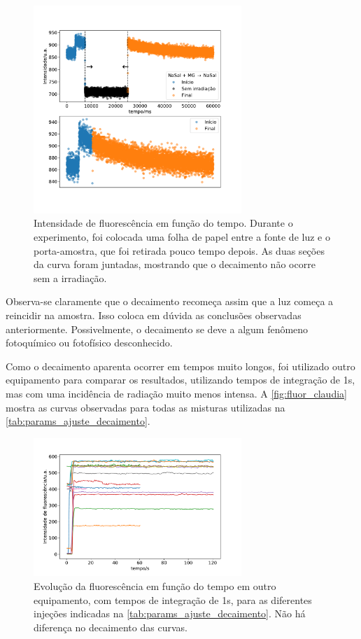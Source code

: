 	\begin{figure}[h]
		\centering
		\includegraphics[width=0.7\textwidth]{imagens/fluor/buraco}
		\caption{Intensidade de fluorescência em função do tempo. Durante o experimento, foi colocada uma folha de papel entre a fonte de luz e o porta-amostra, que foi retirada pouco tempo depois. As duas seções da curva foram juntadas, mostrando que o decaimento não ocorre sem a irradiação.}
		\label{fig:fluorescencia_buraco}
	\end{figure}
	
	Observa-se claramente que o decaimento recomeça assim que a luz começa a reincidir na amostra. Isso coloca em dúvida as conclusões observadas anteriormente. Possivelmente, o decaimento se deve a algum fenômeno fotoquímico ou fotofísico desconhecido.
	
	Como o decaimento aparenta ocorrer em tempos muito longos, foi utilizado outro equipamento para comparar os resultados, utilizando tempos de integração de 1s, mas com uma incidência de radiação muito menos intensa. A \autoref{fig:fluor_claudia} mostra as curvas observadas para todas as misturas utilizadas na  \autoref{tab:params_ajuste_decaimento}.
	
	\begin{figure}[h]
		\centering
		\includegraphics[width=0.7\textwidth]{imagens/fluor/exp_claudia}
		\caption{Evolução da fluorescência em função do tempo em outro equipamento, com tempos de integração de 1s, para as diferentes injeções indicadas na  \autoref{tab:params_ajuste_decaimento}. Não há diferença no decaimento das curvas.}
		\label{fig:fluor_claudia}
	\end{figure}
	
